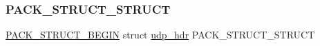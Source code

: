 \subsubsection{\texorpdfstring{P\+A\+C\+K\+\_\+\+S\+T\+R\+U\+C\+T\+\_\+\+S\+T\+R\+U\+CT}{PACK\_STRUCT\_STRUCT}}
{\footnotesize\ttfamily \hyperlink{group__compiler__abstraction_ga73199061891adf1b912d20835c7d5e96}{P\+A\+C\+K\+\_\+\+S\+T\+R\+U\+C\+T\+\_\+\+B\+E\+G\+IN} struct \hyperlink{structudp__hdr}{udp\+\_\+hdr}  P\+A\+C\+K\+\_\+\+S\+T\+R\+U\+C\+T\+\_\+\+S\+T\+R\+U\+CT}

